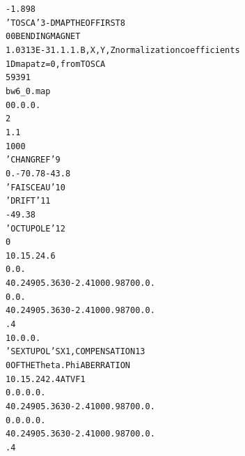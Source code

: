 \begin{tiny}
\begin{alltt}
    -1.898                                                                      
   'TOSCA'                             3-D  MAP  THE  OF  FIRST            8
    0  0                                                    BENDING  MAGNET     
   1.0313E-3  1. 1. 1.                 B, X, Y, Z normalization coefficients    
   1D map at z=0, from TOSCA                                                    
   59  39  1                                                                    
   bw6_0.map                                                                    
   0  0. 0. 0.                                                                  
   2                                                        
     1.1                                                                        
   1 0 0 0                                                                      
   'CHANGREF'                                                              9
   0.  -70.78  -43.8                                                            
  'FAISCEAU'                                                              10
    'DRIFT'                                                               11
      -49.38                                                                    
   'OCTUPOLE'                                                             12
   0                                                        
    10. 15.24  .6                                                               
    0. 0.                                                                       
    4    0.2490   5.3630  -2.4100   0.9870   0.   0.                            
    0. 0.                                                                       
    4    0.2490   5.3630  -2.4100   0.9870   0.   0.                            
    .4                                                                          
    1  0. 0. 0.                                                                 
   'SEXTUPOL'                            SX1, COMPENSATION                13
   0                                     OF  THE  Theta.Phi  ABERRATION         
   10.  15.24  2.4                       AT  VF1                                
    0.  0. 0. 0.                                                                
    4    0.2490   5.3630  -2.4100   0.9870   0.   0.                            
    0. 0.  0. 0.                                                                
    4    0.2490   5.3630  -2.4100   0.9870   0.   0.                            
     .4                                                                         

\end{alltt}
\end{tiny}
